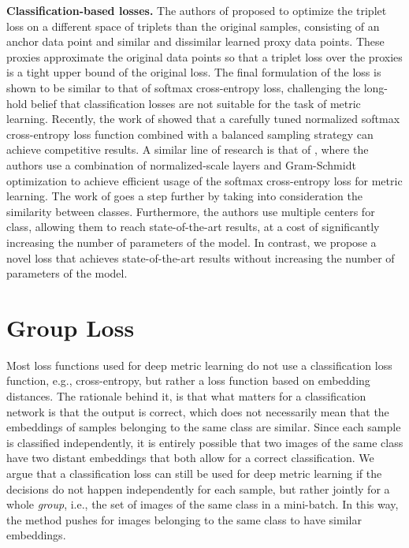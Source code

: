 \documentclass[runningheads]{llncs}
\begin{document}
\noindent\textbf{Classification-based losses.} The authors of \cite{DBLP:conf/iccv/Movshovitz-Attias17} proposed to optimize the triplet loss on a different space of triplets than the original samples, consisting of an anchor data point and similar and dissimilar learned proxy data points. These proxies approximate the original data points so that a triplet loss over the proxies is a tight upper bound of the original loss. The final formulation of the loss is shown to be similar to that of softmax cross-entropy loss, challenging the long-hold belief that classification losses are not suitable for the task of metric learning. Recently, the work of \cite{DBLP:journals/corr/abs-1811-12649} showed that a carefully tuned normalized softmax cross-entropy loss function combined with a balanced sampling strategy can achieve competitive results. A similar line of research is that of \cite{DBLP:conf/aaai/ZhengJSZWH19}, where the authors use a combination of normalized-scale layers and Gram-Schmidt optimization to achieve efficient usage of the softmax cross-entropy loss for metric learning. 
The work of \cite{DBLP:journals/corr/abs-1909-05235} goes a step further by taking into consideration the similarity between classes. Furthermore, the authors use multiple centers for class, allowing them to reach state-of-the-art results, at a cost of significantly increasing the number of parameters of the model. In contrast, we propose a novel loss that achieves state-of-the-art results without increasing the number of parameters of the model.

 
\section{Group Loss}

Most loss functions used for deep metric learning \cite{DBLP:conf/cvpr/SchroffKP15,DBLP:conf/cvpr/SongXJS16,DBLP:conf/nips/Sohn16,DBLP:conf/cvpr/SongJR017,DBLP:conf/iccv/WangZWLL17,DDBLP:conf/cvpr/Wand2019,DBLP:conf/cvpr/WangHKHGR19,DBLP:conf/icml/LawUZ17,DBLP:conf/eccv/GeHDS18,DBLP:conf/iccv/ManmathaWSK17} do not use a classification loss function, e.g., cross-entropy, but rather a loss function based on embedding distances. 
The rationale behind it, is that what matters for a classification network is that the output is correct, which does not necessarily mean that the embeddings of samples belonging to the same class are similar. 
Since each sample is classified independently, it is entirely possible that two images of the same class have two distant embeddings that both allow for a correct classification. 
We argue that a classification loss can still be used for deep metric learning if the decisions do not happen independently for each sample, but rather jointly for a whole {\it group}, i.e., the set of images of the same class in a mini-batch. In this way, the method pushes for images belonging to the same class to have similar embeddings.
\end{document}
